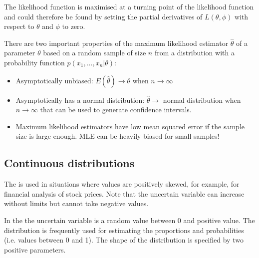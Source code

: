 The likelihood function is maximised at a turning point of the likelihood function and could therefore be found by setting the partial derivatives of $L(\theta,\phi)$ with respect to $\theta$ and $\phi$ to zero.

There are two important properties of the maximum likelihood estimator $\hat{\theta}$ of a parameter $\theta$ based on a random sample of size $n$ from a distribution with a probability function $p(x_1,...,x_n\vert\theta)$:
\begin{itemize}
    \item Asymptotically unbiased: $E(\hat{\theta})\to\theta$ when $n\to\infty$
    \item Asymptotically has a normal distribution: $\hat{\theta}\to$ normal distribution when $n\to\infty$ that can be used to generate confidence intervals.
    \item Maximum likelihood estimators have low mean squared error if the sample size is large enough. MLE can be heavily biased for small samples!
\end{itemize}

\subsection{Continuous distributions}

The  is used in situations where values are positively skewed, for example, for financial analysis of stock prices. Note that the uncertain variable can increase without limits but cannot take negative values.
\begin{center}
\end{center}

In the  the uncertain variable is a random value between 0 and  positive value. The distribution is frequently used for estimating the proportions and probabilities (i.e. values between 0 and 1). The shape of the distribution is specified by two positive parameters.

